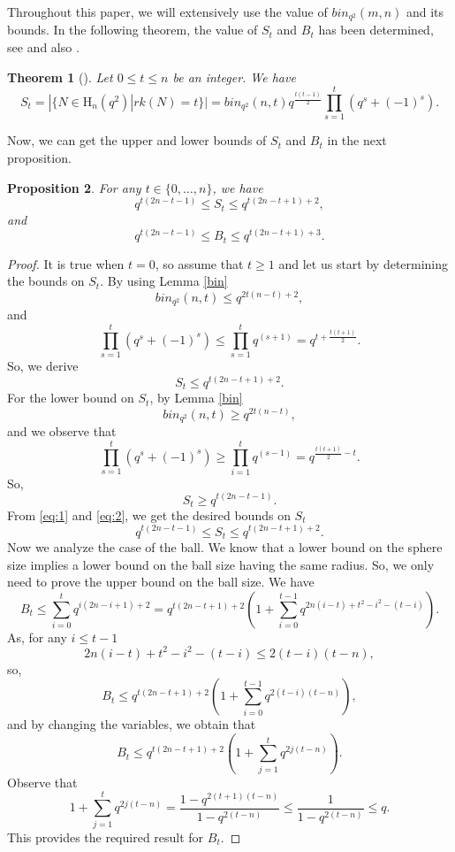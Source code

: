 \documentclass[12pt,a4paper]{article}
\newtheorem{theorem}{Theorem}[section]
\newtheorem{proposition}[theorem]{Proposition}
\begin{document}
 Throughout this paper, we will extensively use the value of $bin_{q^2}(m,n)$  and its bounds. In the following theorem, the value of $S_t$ and $B_t$ has been determined, see \cite{carlitz1955representations} and also \cite{gow2012constant}.
\begin{theorem}[]\label{lem:rhm}
Let $0 \leq t \leq n$ be an integer. We have 
\[S_t=|\{N\in \mathrm{H}_n(q^2)| rk(N)=t\}|=bin_{q^{2}}(n,t)q^{\frac{t(t-1)}{2}}\prod_{s=1}^{t}(q^s+(-1)^s).\]  
\end{theorem}
Now, we can get the upper and lower bounds of $S_t$ and $B_t$ in the next proposition.
\begin{proposition}\label{prop: Boundsize}
For any $t\in\{0,\ldots,n\}$, we have
\[q^{t(2n-t-1)}\leq S_t\leq q^{t(2n-t+1)+2},\]
and
\[q^{t(2n-t-1)}\leq B_t\leq q^{t(2n-t+1)+3}.\]
\end{proposition}
\begin{proof}
    It is true when $t=0$, so assume that $t\geq1$ and let us start by determining the bounds on $S_t$. By using Lemma \ref{bin}
    \[bin_{q^{2}}(n,t)\leq q^{2t(n-t)+2},\]
    and
    \[\prod_{s=1}^{t}(q^{s}+(-1)^{s})\leq\prod_{s=1}^{t}q^{(s+1)}=q^{t+\frac{t(t+1)}{2}}.\]
    So, we derive
    \begin{equation}\label{eq:1}
       S_t\leq q^{t(2n-t+1)+2}.
    \end{equation}
    For the lower bound on $S_t$, by Lemma \ref{bin}
    \[bin_{q^2}(n,t)\geq q^{2t(n-t)},\]
    and we observe that 
    \[\prod_{s=1}^{t}(q^{s}+(-1)^{s})\geq\prod_{i=1}^{t}q^{(s-1)}=q^{\frac{t(t+1)}{2}-t}.\]
    So,
    \begin{equation}\label{eq:2}
    S_t\geq q^{t(2n-t-1)}. 
    \end{equation}
      From \eqref{eq:1} and \eqref{eq:2}, we get the desired bounds on $S_t$
     \[q^{t(2n-t-1)}\leq S_t\leq q^{t(2n-t+1)+2}.\]
     Now we analyze the case of the ball. We know that a lower bound on the sphere size implies a lower bound on the ball size having the same radius. So, we only need to prove the upper bound on the ball size. We have
 \[ B_t\leq \sum _{i=0}^{t}q^{i(2n-i+1)+2} =q^{t(2n-t+1)+2}\left( 1+\sum _{i=0}^{t-1}q^{2n(i-t)+t^2-i^2-(t-i)} \right).\]
 As, for any $i\leq t-1$  \[ 2n(i-t)+t^2-i^2-(t-i)\leq 2(t-i)(t-n),\]
 so, 
 \[B_t\leq q^{t(2n-t+1)+2}\left( 1+\sum _{i=0}^{t-1} q^{2(t-i)(t-n)}\right),\]
and by changing the variables, we obtain that
        \[ B_t\leq q^{t(2n-t+1)+2}(1+\sum _{j=1}^{t}q^{2j(t-n)}).\]
     Observe that
     \[1+\sum _{j=1}^{t}q^{2j(t-n)}=\frac{1-q^{2(t+1)(t-n)}}{1-q^{2(t-n)}}\leq \frac{1}{1-q^{2(t-n)}}\leq q.\]
     This provides the required result for $B_t$. 
\end{proof} 
\end{document}
